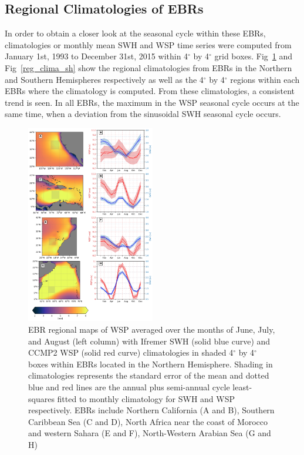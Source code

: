 \documentclass[draft,linenumbers]{agujournal2018}
\begin{document}
\subsection{Regional Climatologies of EBRs}

In order to obtain a closer look at the seasonal cycle within these EBRs, climatologies or monthly mean SWH and WSP time series were computed from January 1st, 1993 to December 31st, 2015 within 4$^{\circ}$ by 4$^{\circ}$ grid boxes. Fig~\ref{reg_clima_nh} and Fig~\ref{reg_clima_sh} show the regional climatologies from EBRs in the Northern and Southern Hemispheres respectively as well as the 4$^{\circ}$ by 4$^{\circ}$ regions within each EBRs where the climatology is computed. From these climatologies, a consistent trend is seen. In all EBRs, the maximum in the WSP seasonal cycle occurs at the same time, when a deviation from the sinusoidal SWH seasonal cycle occurs. 

\begin{figure}[tbh]
\centering
\includegraphics[width=0.5\textwidth]{figs/regional_climatologies/paper_regional_clima_nh.png}
\caption{EBR regional maps of WSP averaged over the months of June, July, and August (left column) with Ifremer SWH (solid blue curve) and CCMP2 WSP (solid red curve) climatologies in shaded 4$^{\circ}$ by 4$^{\circ}$ boxes within EBRs located in the Northern Hemisphere. Shading in climatologies represents the standard error of the mean and dotted blue and red lines are the annual plus semi-annual cycle least-squares fitted to monthly climatology for SWH and WSP respectively. EBRs include Northern California (A and B), Southern Caribbean Sea (C and D), North Africa near the coast of Morocco and western Sahara (E and F), North-Western Arabian Sea (G and H) }
\label{reg_clima_nh}
\end{figure}
\end{document}

